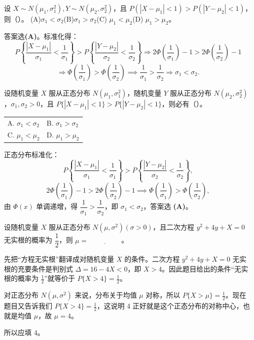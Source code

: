 ﻿\documentclass[lang=cn,11pt]{elegantbook}
\begin{document}
\begin{exercise}[正态分布标准差比较]
设 $X\sim N(\mu_1,\sigma_1^2), Y\sim N(\mu_2,\sigma_2^2)$，且 $P(|X-\mu_1|<1)>P(|Y-\mu_2|<1)$，则（\quad）。
(A)$\sigma_1<\sigma_2$\quad (B)$\sigma_1>\sigma_2$\quad (C) $\mu_1<\mu_2$\quad (D) $\mu_1>\mu_2$。
\end{exercise}
\begin{solution}
答案选\textbf{(A)}。标准化得：
\[
P\left\{\frac{|X-\mu_1|}{\sigma_1}<\frac{1}{\sigma_1}\right\}>P\left\{\frac{|Y-\mu_2|}{\sigma_2}<\frac{1}{\sigma_2}\right\}
\Rightarrow 2\Phi\left(\frac{1}{\sigma_1}\right)-1 > 2\Phi\left(\frac{1}{\sigma_2}\right)-1
\]
\[
\Rightarrow \Phi\left(\frac{1}{\sigma_1}\right)>\Phi\left(\frac{1}{\sigma_2}\right)\implies
\frac{1}{\sigma_1}>\frac{1}{\sigma_2} \Rightarrow \sigma_1<\sigma_2.
\]
\end{solution}

\begin{exercise}[正态分布标准差比较] \label{exer:2-34}
设随机变量 $X$ 服从正态分布 $N(\mu_1,\sigma_1^2)$，随机变量 $Y$ 服从正态分布 $N(\mu_2,\sigma_2^2)$，$\sigma_1,\sigma_2>0$，且 $P\{|X-\mu_1|<1\}>P\{|Y-\mu_2|<1\}$，则必有（\quad）。
\begin{tabular}{ll}
A. $\sigma_1<\sigma_2$ & B. $\sigma_1>\sigma_2$ \\
C. $\mu_1<\mu_2$ & D. $\mu_1>\mu_2$
\end{tabular}
\end{exercise}
\begin{solution}
正态分布标准化：
\[
P\left\{\frac{|X-\mu_1|}{\sigma_1}<\frac{1}{\sigma_1}\right\}>P\left\{\frac{|Y-\mu_2|}{\sigma_2}<\frac{1}{\sigma_2}\right\},
\]
\[
2\Phi\left(\frac{1}{\sigma_1}\right)-1 > 2\Phi\left(\frac{1}{\sigma_2}\right)-1 \implies \Phi\left(\frac{1}{\sigma_1}\right)>\Phi\left(\frac{1}{\sigma_2}\right),
\]
由 $\Phi(x)$ 单调递增，得 $\dfrac{1}{\sigma_1}>\dfrac{1}{\sigma_2}$，即 $\sigma_1<\sigma_2$，答案选 \textbf{(A)}。
\end{solution}


\begin{exercise}[正态分布参数求解] \label{exer:2-39}
设随机变量 $X$ 服从正态分布 $N(\mu,\sigma^2)(\sigma>0)$，且二次方程 $y^2+4y+X=0$ 无实根的概率为 $\dfrac{1}{2}$，则 $\mu=\underline{\hspace{2cm}}$。
\end{exercise}

\begin{solution}
先把“方程无实根”翻译成对随机变量 \(X\) 的条件。二次方程 \(y^2+4y+X=0\) 无实根的充要条件是判别式 \(\Delta=16-4X<0\)，即 \(X>4\)。因此题目给出的条件“无实根的概率为 \(\frac12\)”就等价于 \(P\{X>4\}=\frac12\)。

对正态分布 \(N(\mu,\sigma^2)\) 来说，分布关于均值 \(\mu\) 对称，所以 \(P\{X>\mu\}=\frac12\)。现在题目又告诉我们 \(P\{X>4\}=\frac12\)，这说明 4 正好就是这个正态分布的对称中心，也就是均值 \(\mu\)，故 \(\mu=4\)。

所以应填 \(\boxed{4}\)。
\end{solution}
\end{document}

